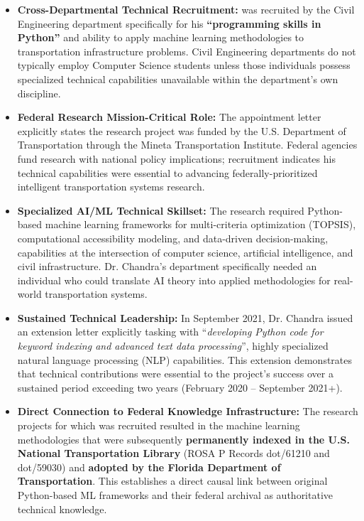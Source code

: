 \begin{itemize}
\item \textbf{Cross-Departmental Technical Recruitment:} \dr was recruited by the Civil Engineering department specifically for his \textbf{``programming skills in Python''} and ability to apply machine learning methodologies to transportation infrastructure problems. Civil Engineering departments do not typically employ Computer Science students unless those individuals possess specialized technical capabilities unavailable within the department's own discipline.

\item \textbf{Federal Research Mission-Critical Role:} The appointment letter explicitly states the research project was funded by the U.S. Department of Transportation through the Mineta Transportation Institute. Federal agencies fund research with national policy implications; \drs recruitment indicates his technical capabilities were essential to advancing federally-prioritized intelligent transportation systems research.

\item \textbf{Specialized AI/ML Technical Skillset:} The research required Python-based machine learning frameworks for multi-criteria optimization (TOPSIS), computational accessibility modeling, and data-driven decision-making, capabilities at the intersection of computer science, artificial intelligence, and civil infrastructure. Dr. Chandra's department specifically needed an individual who could translate AI theory into applied methodologies for real-world transportation systems.

\item \textbf{Sustained Technical Leadership:} In September 2021, Dr. Chandra issued an extension letter explicitly tasking \dr with ``\textit{developing Python code for keyword indexing and advanced text data processing}'', highly specialized natural language processing (NLP) capabilities. This extension demonstrates that \drs technical contributions were essential to the project's success over a sustained period exceeding two years (February 2020 -- September 2021+).

\item \textbf{Direct Connection to Federal Knowledge Infrastructure:} The research projects for which \dr was recruited resulted in the machine learning methodologies that were subsequently \textbf{permanently indexed in the U.S. National Transportation Library} (ROSA P Records dot/61210 and dot/59030) and \textbf{adopted by the Florida Department of Transportation}. This establishes a direct causal link between \drs original Python-based ML frameworks and their federal archival as authoritative technical knowledge.
\end{itemize}

